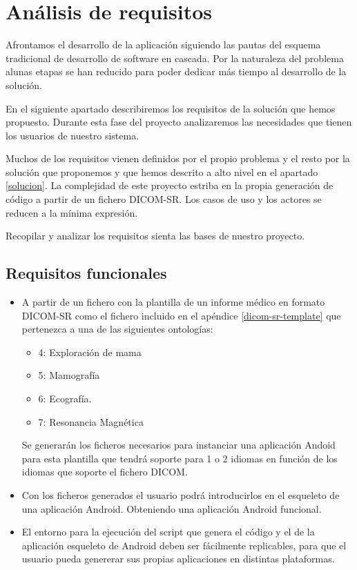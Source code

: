 \section{Análisis de requisitos}

Afrontamos el desarrollo de la aplicación siguiendo las pautas del esquema tradicional de desarrollo de software en cascada. Por la naturaleza del problema alunas etapas se han reducido para poder dedicar más tiempo al desarrollo de la solución.\medskip\par
En el siguiente apartado describiremos los requisitos de la solución que hemos propuesto. Durante esta fase del proyecto analizaremos las necesidades que tienen los usuarios de nuestro sistema.\par
Muchos de los requisitos vienen definidos por el propio problema y el resto por la solución que proponemos y que hemos descrito a alto nivel en el apartado \ref{solucion}. La complejidad de este proyecto estriba en la propia generación de código a partir de un fichero DICOM-SR. Los casos de uso y los actores se reducen a la mínima expresión.\par
Recopilar y analizar los requisitos sienta las bases de nuestro proyecto.\par
\subsection{Requisitos funcionales}
\begin{itemize}
	\item A partir de un fichero con la plantilla de un informe médico en formato DICOM-SR como el fichero incluido en el apéndice \ref{dicom-sr-template} que pertenezca a una de las siguientes ontologías:
		\begin{itemize}
			\item 4: Exploración de mama
			\item 5: Mamografía
			\item 6: Ecografía.
			\item 7: Resonancia Magnética
		\end{itemize}
		Se generarán los ficheros necesarios para instanciar una aplicación Andoid para esta plantilla que tendrá soporte para 1 o 2 idiomas en función de los idiomas que soporte el fichero DICOM.
	\item Con los ficheros generados el usuario podrá introducirlos en el esqueleto de una aplicación Android. Obteniendo una aplicación Android funcional.
	\item El entorno para la ejecución del script que genera el código y el de la aplicación esqueleto de Android deben ser fácilmente replicables, para que el usuario pueda genererar sus propias aplicaciones en distintas plataformas. 
\end{itemize}
